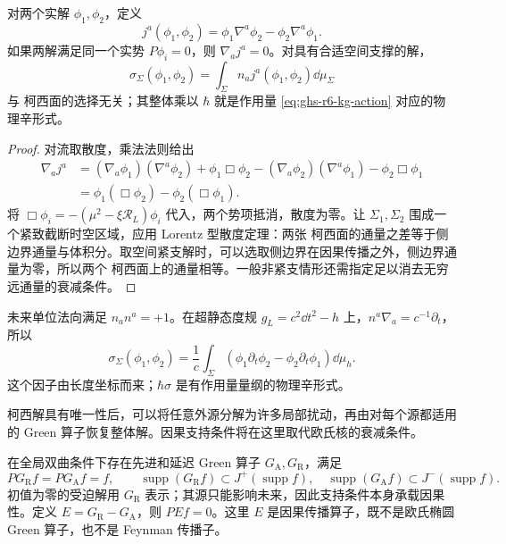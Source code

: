\begin{proposition}[解空间上的守恒辛流]\label{prop:ghs-r6-symplectic-current}
对两个实解 $\phi_1,\phi_2$，定义
\begin{equation}\label{eq:ghs-r6-current}
j^a(\phi_1,\phi_2)=\phi_1\nabla^a\phi_2-\phi_2\nabla^a\phi_1.
\end{equation}
如果两解满足同一个实势 $P\phi_i=0$，则 $\nabla_aj^a=0$。对具有合适空间支撑的解，
\begin{equation}\label{eq:ghs-r6-covariant-symplectic}
\sigma_\Sigma(\phi_1,\phi_2)=\int_\Sigma n_aj^a(\phi_1,\phi_2)\dd\mu_\Sigma
\end{equation}
与 柯西面的选择无关；其整体乘以 $\hbar$ 就是作用量 \cref{eq:ghs-r6-kg-action} 对应的物理辛形式。
\end{proposition}
\begin{proof}
对流取散度，乘法法则给出
\begin{align*}
\nabla_aj^a&=(\nabla_a\phi_1)(\nabla^a\phi_2)+\phi_1\Box\phi_2
 -(\nabla_a\phi_2)(\nabla^a\phi_1)-\phi_2\Box\phi_1\\
&=\phi_1(\Box\phi_2)-\phi_2(\Box\phi_1).
\end{align*}
将 $\Box\phi_i=-(\mu^2-\xi\mathcal R_L)\phi_i$ 代入，两个势项抵消，散度为零。让 $\Sigma_1,\Sigma_2$ 围成一个紧致截断时空区域，应用 Lorentz 型散度定理：两张 柯西面的通量之差等于侧边界通量与体积分。取空间紧支解时，可以选取侧边界在因果传播之外，侧边界通量为零，所以两个 柯西面上的通量相等。一般非紧支情形还需指定足以消去无穷远通量的衰减条件。
\end{proof}

未来单位法向满足 $n_an^a=+1$。在超静态度规 $g_L=c^2\dd t^2-h$ 上，$n^a\nabla_a=c^{-1}\partial_t$，所以
\[
 \sigma_\Sigma(\phi_1,\phi_2)=\frac1c\int_\Sigma
 (\phi_1\partial_t\phi_2-\phi_2\partial_t\phi_1)\dd\mu_h.
\]
这个因子由长度坐标而来；$\hbar\sigma$ 是有作用量量纲的物理辛形式。

柯西解具有唯一性后，可以将任意外源分解为许多局部扰动，再由对每个源都适用的 Green 算子恢复整体解。因果支持条件将在这里取代欧氏核的衰减条件。


在全局双曲条件下存在先进和延迟 Green 算子 $G_{\mathrm A},G_{\mathrm R}$，满足
\begin{equation}\label{eq:ghs-r6-causal-green}
PG_{\mathrm R}f=PG_{\mathrm A}f=f,
\qquad\operatorname{supp}(G_{\mathrm R}f)\subset J^+(\operatorname{supp}f),
\quad\operatorname{supp}(G_{\mathrm A}f)\subset J^-(\operatorname{supp}f).
\end{equation}
初值为零的受迫解用 $G_{\mathrm R}$ 表示；其源只能影响未来，因此支持条件本身承载因果性。定义 $E=G_{\mathrm R}-G_{\mathrm A}$，则 $PEf=0$。这里 $E$ 是因果传播算子，既不是欧氏椭圆 Green 算子，也不是 Feynman 传播子。

